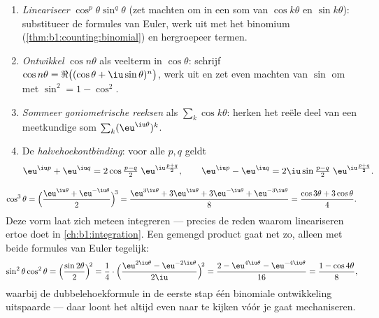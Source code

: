 \begin{method}\label{met:b1:complex:trig}
\begin{enumerate}
  \item \emph{Lineariseer} $\cos^p\theta \sin^q\theta$ (zet machten om
        in een som van $\cos k\theta$ en $\sin k\theta$): substitueer de
        formules van Euler, werk uit met het binomium
        (\cref{thm:b1:counting:binomial}) en hergroepeer 
        termen.
  \item \emph{Ontwikkel} $\cos n\theta$ als veelterm in $\cos\theta$:
        schrijf $\cos n\theta = \Re\bigl((\cos\theta +
        \iu\sin\theta)^n\bigr)$, werk uit en zet even machten van
        $\sin$ om met $\sin^2 = 1 - \cos^2$.
  \item \emph{Sommeer goniometrische reeksen} als $\sum_k \cos k\theta$:
        herken het reële deel van een meetkundige som $\sum_k
        (\eu^{\iu\theta})^k$.
  \item De \emph{halvehoekontbinding}: voor alle $p, q$ geldt
        \[
        \eu^{\iu p} + \eu^{\iu q}
        = 2 \cos\tfrac{p - q}{2}\; \eu^{\iu \frac{p+q}{2}},
        \qquad
        \eu^{\iu p} - \eu^{\iu q}
        = 2\iu \sin\tfrac{p - q}{2}\; \eu^{\iu \frac{p+q}{2}} .
        \]
\end{enumerate}
\end{method}

\begin{example}[Lineariseren]\label{ex:b1:complex:linearize}
\[
\cos^3\theta
= \Bigl(\frac{\eu^{\iu\theta} + \eu^{-\iu\theta}}{2}\Bigr)^{\!3}
= \frac{\eu^{3\iu\theta} + 3\eu^{\iu\theta} + 3\eu^{-\iu\theta} +
\eu^{-3\iu\theta}}{8}
= \frac{\cos 3\theta + 3\cos\theta}{4}.
\]
Deze vorm laat zich meteen integreren --- precies de reden waarom
lineariseren ertoe doet in \cref{ch:b1:integration}. Een gemengd
product gaat net zo, alleen met beide formules van Euler tegelijk:
\[
\sin^2\theta\cos^2\theta
= \Bigl(\frac{\sin2\theta}2\Bigr)^{\!2}
= \frac{1}{4}\cdot
\Bigl(\frac{\eu^{2\iu\theta} - \eu^{-2\iu\theta}}{2\iu}
\Bigr)^{\!2}
= \frac{2 - \eu^{4\iu\theta} - \eu^{-4\iu\theta}}{16}
= \frac{1 - \cos4\theta}{8} ,
\]
waarbij de dubbelehoekformule in de eerste stap één binomiale
ontwikkeling uitspaarde --- daar loont het altijd even naar te kijken
vóór je gaat mechaniseren.
\end{example}

